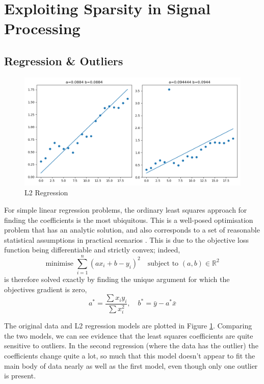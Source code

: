 \documentclass[12pt]{article}
\begin{document}
\section{Exploiting Sparsity in Signal Processing}

\subsection{Regression \& Outliers}

\begin{figure}[htp]
    \includegraphics[scale=0.5, center]{figures/regression_l2.png}
    \caption{L2 Regression}
    \label{fig:regression_l2}
\end{figure}

For simple linear regression problems, the ordinary least squares approach for finding the coefficients is the most ubiquitous.
This is a well-posed optimisation problem that has an analytic solution, and also corresponds to a set of reasonable statistical assumptions in practical scenarios \cite{islp}.
This is due to the objective loss function being differentiable and strictly convex; indeed,
\[\text{minimise } \sum_{i=1}^{n}{(ax_i+b-y_i)^2} \quad \text{subject to } (a, b)\in\mathbb{R}^2\]
is therefore solved exactly by finding the unique argument for which the objectives gradient is zero,
\[a^*=\frac{\sum x_i y_i}{\sum x_i^2},\quad b^*=\bar{y} - a^*\bar{x}\]

The original data and L2 regression models are plotted in Figure \ref{fig:regression_l2}.
Comparing the two models, we can see evidence that the least squares coefficients are quite sensitive to outliers.
In the second regression (where the data has the outlier) the coefficients change quite a lot,
so much that this model doesn't appear to fit the main body of data nearly as well as the first model,
even though only one outlier is present.
\end{document}
